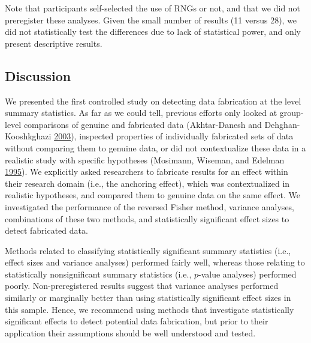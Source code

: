 \documentclass[a5paper]{book}
\begin{document}
Note that participants self-selected the use of RNGs or not, and that we
did not preregister these analyses. Given the small number of results
(11 versus 28), we did not statistically test the differences due to
lack of statistical power, and only present descriptive results.

\subsection{Discussion}\label{discussion-4}

We presented the first controlled study on detecting data fabrication at
the level summary statistics. As far as we could tell, previous efforts
only looked at group-level comparisons of genuine and fabricated data
(Akhtar-Danesh and Dehghan-Kooshkghazi
\protect\hyperlink{ref-doi:10.1186ux2f1471-2288-3-18}{2003}), inspected
properties of individually fabricated sets of data without comparing
them to genuine data, or did not contextualize these data in a realistic
study with specific hypotheses (Mosimann, Wiseman, and Edelman
\protect\hyperlink{ref-doi:10.1080ux2f08989629508573866}{1995}). We
explicitly asked researchers to fabricate results for an effect within
their research domain (i.e., the anchoring effect), which was
contextualized in realistic hypotheses, and compared them to genuine
data on the same effect. We investigated the performance of the reversed
Fisher method, variance analyses, combinations of these two methods, and
statistically significant effect sizes to detect fabricated data.

Methods related to classifying statistically significant summary
statistics (i.e., effect sizes and variance analyses) performed fairly
well, whereas those relating to statistically nonsignificant summary
statistics (i.e., \(p\)-value analyses) performed poorly.
Non-preregistered results suggest that variance analyses performed
similarly or marginally better than using statistically significant
effect sizes in this sample. Hence, we recommend using methods that
investigate statistically significant effects to detect potential data
fabrication, but prior to their application their assumptions should be
well understood and tested.
\end{document}
